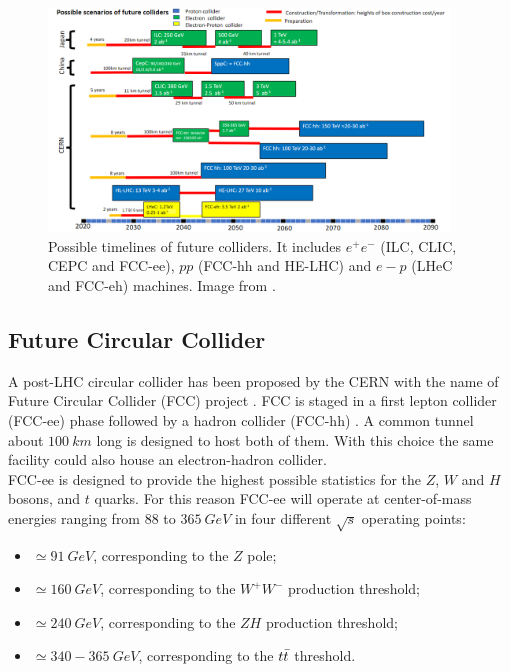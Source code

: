 \begin{figure}
	\includegraphics[width = 0.95\textwidth]{IMG/Cap1/Roadmap.png}
	\caption{Possible  timelines  of  future  colliders.  It includes $e^+e^-$ (ILC,  CLIC,  CEPC  and  FCC-ee), $pp$ (FCC-hh  and HE-LHC) and $e-p$ (LHeC and FCC-eh) machines. Image from \cite{roadmap}.}
	\label{fig:roadmap}
\end{figure}

\subsection*{Future Circular Collider}
A post-LHC circular collider has been proposed by the CERN with the name of Future Circular Collider (FCC) project \cite{FCC}. FCC is staged in a first lepton collider (FCC-ee) \cite{FCC-ee} phase followed by a hadron collider (FCC-hh) \cite{FCC-hh}. A common tunnel about $100\ km$ long is designed to host both of them. With this choice the same facility could also house an electron-hadron collider.\\
FCC-ee is designed to provide the highest possible statistics for the $Z$, $W$ and $H$ bosons, and $t$ quarks. For this reason FCC-ee will operate at center-of-mass energies ranging from $88$ to $365\ GeV$ in four different $\sqrt{s}$ operating points:
\begin{itemize}
    \item $\simeq 91\ GeV$, corresponding to the $Z$ pole;
    \item $\simeq 160\ GeV$, corresponding to the $W^+W^-$ production threshold;
    \item $\simeq 240\ GeV$, corresponding to the $ZH$ production threshold;
    \item $\simeq 340-365\ GeV$, corresponding to the $t\Bar{t}$ threshold.
\end{itemize}

